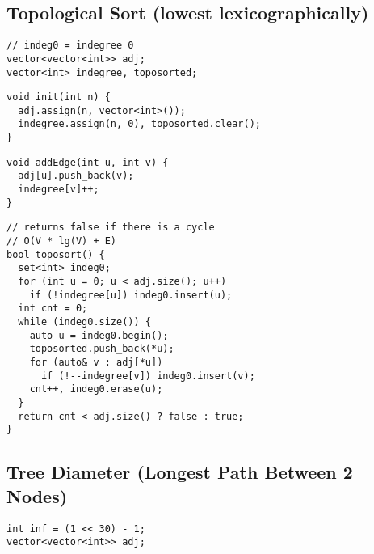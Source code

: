 \documentclass[twoside]{article}
\begin{document}
\begin{multicols*}{2}
\subsectionfont{\large\bfseries\sffamily\underline}
\subsection*{Topological Sort (lowest lexicographically)}
\begin{verbatim}
// indeg0 = indegree 0
vector<vector<int>> adj;
vector<int> indegree, toposorted;
\end{verbatim}
\vspace{-12pt}
\begin{verbatim}
void init(int n) {
  adj.assign(n, vector<int>());
  indegree.assign(n, 0), toposorted.clear();
}
\end{verbatim}
\vspace{-12pt}
\begin{verbatim}
void addEdge(int u, int v) {
  adj[u].push_back(v);
  indegree[v]++;
}
\end{verbatim}
\vspace{-12pt}
\begin{verbatim}
// returns false if there is a cycle
// O(V * lg(V) + E)
bool toposort() {
  set<int> indeg0;
  for (int u = 0; u < adj.size(); u++)
    if (!indegree[u]) indeg0.insert(u);
  int cnt = 0;
  while (indeg0.size()) {
    auto u = indeg0.begin();
    toposorted.push_back(*u);
    for (auto& v : adj[*u])
      if (!--indegree[v]) indeg0.insert(v);
    cnt++, indeg0.erase(u);
  }
  return cnt < adj.size() ? false : true;
}
\end{verbatim}

\subsectionfont{\large\bfseries\sffamily\underline}
\subsection*{Tree Diameter (Longest Path Between 2 Nodes)}
\begin{verbatim}
int inf = (1 << 30) - 1;
vector<vector<int>> adj;


\end{verbatim}
\end{multicols*}
\end{document}
